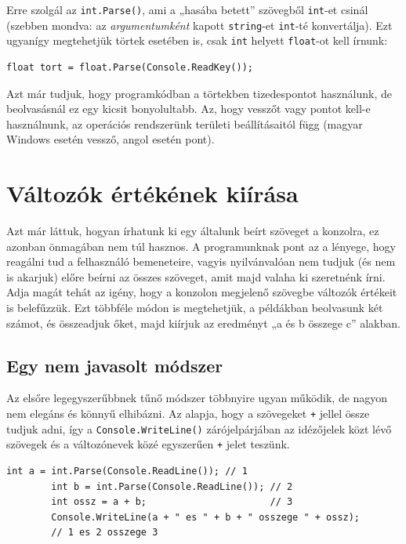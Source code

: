 \documentclass[a4paper]{article}
\begin{document}
	
	Erre szolgál az \lstinline{int.Parse()}, ami a „hasába betett” szövegből \lstinline{int}-et csinál (szebben mondva: az \emph{argumentumként} kapott \lstinline{string}-et \lstinline{int}-té konvertálja). Ezt ugyanígy megtehetjük törtek esetében is, csak \lstinline{int} helyett \lstinline{float}-ot kell írnunk:
	
	\begin{lstlisting}[caption=Törtszám beolvasása, label=lst:readFloatParse]
		float tort = float.Parse(Console.ReadKey());
	\end{lstlisting}
	
	Azt már tudjuk, hogy programkódban a törtekben tizedespontot használunk, de beolvasásnál ez egy kicsit bonyolultabb. Az, hogy vesszőt vagy pontot kell-e használnunk, az operációs rendszerünk területi beállításaitól függ (magyar Windows esetén vessző, angol esetén pont).
	
	\section{Változók értékének kiírása}
	Azt már láttuk, hogyan írhatunk ki egy általunk beírt szöveget a konzolra, ez azonban önmagában nem túl hasznos. A programunknak pont az a lényege, hogy reagálni tud a felhasználó bemeneteire, vagyis nyilvánvalóan nem tudjuk (és nem is akarjuk) előre beírni az összes szöveget, amit majd valaha ki szeretnénk írni. Adja magát tehát az igény, hogy a konzolon megjelenő szövegbe változók értékeit is belefűzzük. Ezt többféle módon is megtehetjük, a példákban beolvasunk két számot, és összeadjuk őket, majd kiírjuk az eredményt „a és b összege c” alakban.
	
	\subsection{Egy nem javasolt módszer}
	Az elsőre legegyszerűbbnek tűnő módszer többnyire ugyan működik, de nagyon nem elegáns és könnyű elhibázni. Az alapja, hogy a szövegeket \lstinline{+} jellel össze tudjuk adni, így a \lstinline{Console.WriteLine()} zárójelpárjában az idézőjelek közt lévő szövegek és a változónevek közé egyszerűen \lstinline{+} jelet teszünk.
	
	\begin{lstlisting}[caption=Változók értékének kiírása -- nem elegánsan, label=lst:writeVarsNotElegant]
		int a = int.Parse(Console.ReadLine()); // 1
		int b = int.Parse(Console.ReadLine()); // 2
		int ossz = a + b;                      // 3
		Console.WriteLine(a + " es " + b + " osszege " + ossz);
		// 1 es 2 osszege 3
	\end{lstlisting}
	
\end{document}
